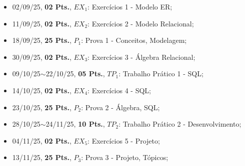 \documentclass[12pt, a4paper]{article}
\begin{document}
\begin{itemize}\setlength{\itemsep}{0pt}
    \item 02/09/25, \textbf{02 Pts.}, $EX_1$: Exercícios 1 - Modelo ER;
    \item 11/09/25, \textbf{02 Pts.}, $EX_2$: Exercícios 2 - Modelo Relacional;
    \item 18/09/25, \textbf{25 Pts.}, $P_1$: Prova 1 - Conceitos, Modelagem;
    \item 30/09/25, \textbf{02 Pts.}, $EX_3$: Exercícios 3 - Álgebra Relacional;
    \item 09/10/25$\sim$22/10/25, \textbf{05 Pts.}, $TP_1$: Trabalho Prático 1 - SQL;
    \item 14/10/25, \textbf{02 Pts.}, $EX_4$: Exercícios 4 - SQL;
    \item 23/10/25, \textbf{25 Pts.}, $P_2$: Prova 2 - Álgebra, SQL;
    \item 28/10/25$\sim$24/11/25, \textbf{10 Pts.}, $TP_2$: Trabalho Prático 2 - Desenvolvimento;
    \item 04/11/25, \textbf{02 Pts.}, $EX_5$: Exercícios 5 - Projeto;
    \item 13/11/25, \textbf{25 Pts.}, $P_3$: Prova 3 - Projeto, Tópicos;
\end{itemize}

\begin{comment}
\begin{table}[htbp] \centering \caption{Avaliações} \label{tab:Avaliacoes}
    \begin{tabular}{|c|l|l|c|}
    \hline
        Data                   & Nome                        & Conteúdo               & Pontos \\ \hline
        02/09/25               & $EX_1$: Exercícios 1        & Modelo ER              & 02     \\
        11/09/25               & $EX_2$: Exercícios 2        & Modelo Relacional      & 02     \\
        18/09/25               & $P_1$: Prova 1              & Conceitos, Modelagem   & 25     \\
        30/09/25               & $EX_3$: Exercícios 3        & Álgebra Relacional     & 02     \\
        09/10/25$\sim$22/10/25 & $TP_1$: Trabalho Prático 1  & SQL                    & 05     \\
        14/10/25               & $EX_4$: Exercícios 4        & SQL                    & 02     \\
        23/10/25               & $P_2$: Prova 2              & Álgebra, SQL           & 25     \\
        28/10/25$\sim$24/11/25 & $TP_2$: Trabalho Prático 2  & Desenvolvimento        & 10     \\
        04/11/25               & $EX_5$: Exercícios 5        & Projeto                & 02     \\
        13/11/25               & $P_3$: Prova 3              & Projeto, Tópicos       & 25     \\ \hline
    \end{tabular}
\end{table}
\end{comment}
\end{document}
